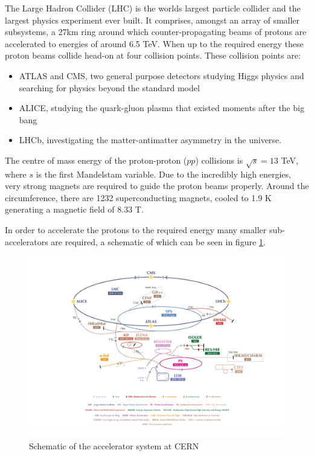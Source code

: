 The Large Hadron Collider (LHC) is the worlds largest particle collider and the largest physics experiment ever built. 
It comprises, amongst an array of smaller subsystems, a 27km ring around which counter-propagating beams of protons are accelerated to energies of around 6.5 TeV. 
When up to the required energy these proton beams collide head-on at four collision points.
These collision points are:
\begin{itemize}
\item ATLAS and CMS, two general purpose detectors studying Higgs physics and searching for physics beyond the standard model
\item ALICE, studying the quark-gluon plasma that existed moments after the big bang
\item LHCb, investigating the matter-antimatter asymmetry in the universe.
\end{itemize}
The centre of mass energy of the proton-proton ($pp$) collisions is $\sqrt{s}=13$ TeV, where $s$ is the first Mandelstam variable.
Due to the incredibly high energies, very strong magnets are required to guide the proton beams properly.
Around the circumference, there are 1232 superconducting magnets, cooled to 1.9 K generating a magnetic field of 8.33 T.

In order to accelerate the protons to the required energy many smaller sub-accelerators are required, a schematic of which can be seen in figure \ref{fig:LHC}.

\begin{figure}[H] %
   \centering
   \includegraphics[width=.8\textwidth]{Pictures/LHC.png} 
   \caption{Schematic of the accelerator system at CERN \cite{Mobs:2197559}}
   \label{fig:LHC}
\end{figure}

